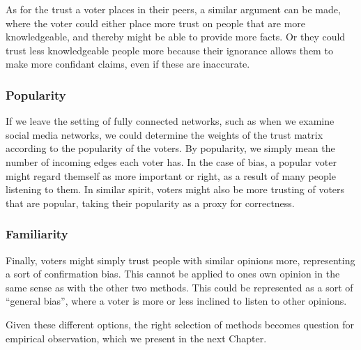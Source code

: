 As for the trust a voter places in their peers, a similar argument can be made,
where the voter could either place more trust on people that are more
knowledgeable, and thereby might be able to provide more facts. Or they could
trust less knowledgeable people more because their ignorance allows them to
make more confidant claims, even if these are inaccurate. 


\subsubsection{Popularity}
If we leave the setting of fully connected networks, such as when we examine
social media networks, we could determine the weights of the trust matrix
according to the popularity of the voters. By popularity, we simply mean the
number of incoming edges each voter has. In the case of bias, a popular voter
might regard themself as more important or right, as a result of many people
listening to them. In similar spirit, voters might also be more trusting of
voters that are popular, taking their popularity as a proxy for correctness.

\subsubsection{Familiarity} Finally, voters might simply trust people with
similar opinions more, representing a sort of confirmation bias. This cannot be
applied to ones own opinion in the same sense as with the other two methods.
This could be represented as a sort of ``general bias'', where a voter is more
or less inclined to listen to other opinions.


Given these different options, the right selection of methods becomes question
for empirical observation, which we present in the next Chapter.

